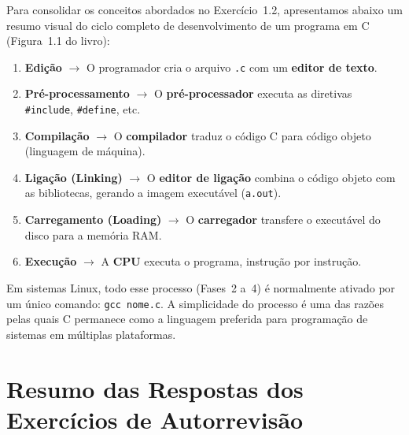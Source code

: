 \documentclass[12pt,a4paper]{article}
\begin{document}
Para consolidar os conceitos abordados no Exercício~1.2, apresentamos abaixo um resumo
visual do ciclo completo de desenvolvimento de um programa em C (Figura~1.1 do livro):

\bigskip

\begin{tcolorbox}[colback=deitelgray, colframe=deitelblue, title={\bfseries As Seis Fases do Desenvolvimento em C}, breakable]
\begin{enumerate}
  \item[\textbf{Fase 1}] \textbf{Edição} $\longrightarrow$ O programador cria o arquivo
  \texttt{.c} com um \textbf{editor de texto}.

  \item[\textbf{Fase 2}] \textbf{Pré-processamento} $\longrightarrow$ O \textbf{pré-processador}
  executa as diretivas \texttt{\#include}, \texttt{\#define}, etc.

  \item[\textbf{Fase 3}] \textbf{Compilação} $\longrightarrow$ O \textbf{compilador}
  traduz o código C para código objeto (linguagem de máquina).

  \item[\textbf{Fase 4}] \textbf{Ligação (Linking)} $\longrightarrow$ O \textbf{editor de
  ligação} combina o código objeto com as bibliotecas, gerando a imagem executável
  (\texttt{a.out}).

  \item[\textbf{Fase 5}] \textbf{Carregamento (Loading)} $\longrightarrow$ O
  \textbf{carregador} transfere o executável do disco para a memória RAM.

  \item[\textbf{Fase 6}] \textbf{Execução} $\longrightarrow$ A \textbf{CPU} executa o
  programa, instrução por instrução.
\end{enumerate}
\end{tcolorbox}

\bigskip

\begin{portab}
  Em sistemas Linux, todo esse processo (Fases~2 a~4) é normalmente ativado por um
  único comando: \texttt{gcc nome.c}. A simplicidade do processo é uma das razões
  pelas quais C permanece como a linguagem preferida para programação de sistemas
  em múltiplas plataformas.
\end{portab}

\newpage

\section*{Resumo das Respostas dos Exercícios de Autorrevisão}
\end{document}
